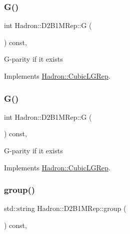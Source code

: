 \subsubsection{\texorpdfstring{G()}{G()}\hspace{0.1cm}{\footnotesize\ttfamily [2/3]}}
{\footnotesize\ttfamily int Hadron\+::\+D2\+B1\+M\+Rep\+::G (\begin{DoxyParamCaption}{ }\end{DoxyParamCaption}) const\hspace{0.3cm}{\ttfamily [inline]}, {\ttfamily [virtual]}}

G-\/parity if it exists 

Implements \mbox{\hyperlink{structHadron_1_1CubicLGRep_ace26f7b2d55e3a668a14cb9026da5231}{Hadron\+::\+Cubic\+L\+G\+Rep}}.

\mbox{\label{structHadron_1_1D2B1MRep_abc6ac4ea31c661443bb658c8508bf378}} 
\subsubsection{\texorpdfstring{G()}{G()}\hspace{0.1cm}{\footnotesize\ttfamily [3/3]}}
{\footnotesize\ttfamily int Hadron\+::\+D2\+B1\+M\+Rep\+::G (\begin{DoxyParamCaption}{ }\end{DoxyParamCaption}) const\hspace{0.3cm}{\ttfamily [inline]}, {\ttfamily [virtual]}}

G-\/parity if it exists 

Implements \mbox{\hyperlink{structHadron_1_1CubicLGRep_ace26f7b2d55e3a668a14cb9026da5231}{Hadron\+::\+Cubic\+L\+G\+Rep}}.

\mbox{\label{structHadron_1_1D2B1MRep_a7857a8d3cbac3930e53e1e9fa474a478}} 
\subsubsection{\texorpdfstring{group()}{group()}\hspace{0.1cm}{\footnotesize\ttfamily [1/3]}}
{\footnotesize\ttfamily std\+::string Hadron\+::\+D2\+B1\+M\+Rep\+::group (\begin{DoxyParamCaption}{ }\end{DoxyParamCaption}) const\hspace{0.3cm}{\ttfamily [inline]}, {\ttfamily [virtual]}}

